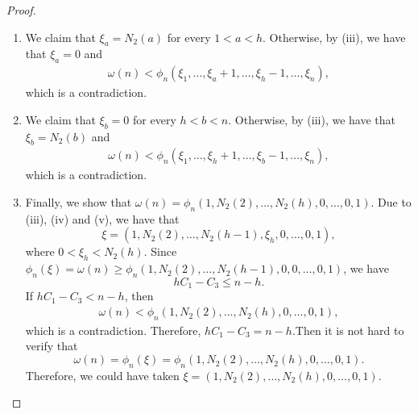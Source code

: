 \documentclass[JMC]{degruyter-journal}
\begin{document}
\begin{proof}
\begin{enumerate}
\item We claim that $\xi_a=N_2(a)$ for every $1<a<h$. Otherwise, by (iii), we have that $\xi_a=0$ and
\begin{eqnarray*}
\omega(n)<\phi_n(\xi_1,\hdots, \xi_{a}+1, \hdots, \xi_h-1, \hdots,
\xi_n),
\end{eqnarray*}
which is a contradiction.



\item We claim  that $\xi_b=0$ for every $h<b<n$. Otherwise, by (iii), we have that $\xi_b=N_2(b)$ and
\begin{eqnarray*}
\omega(n)< \phi_n(\xi_1,\hdots, \xi_h+1, \hdots, \xi_b-1, \hdots, \xi_n),
\end{eqnarray*}
which is a contradiction.

\item
Finally, we show that  $\omega(n)=\phi_n(1,N_2(2),\ldots, N_2(h),
0,\ldots,0,1)$. Due to (iii), (iv) and (v), we have that
$$\xi=(1,N_2(2),\ldots, N_2(h-1),\xi_h, 0,\ldots,0,1),$$
where $0<\xi_h<N_2(h)$.
Since $\phi_n(\xi)=\omega(n)\geq \phi_n(1,N_2(2),\ldots, N_2(h-1),0,
0,\ldots,0,1)$, we have
$$hC_1-C_3\leq n-h.$$  If $hC_1-C_3<  n-h$, then
\begin{eqnarray*}
\omega(n)<\phi_n(1,N_2(2),\ldots, N_2(h), 0,\ldots,0,1),
\end{eqnarray*}
which is a contradiction. Therefore, $hC_1-C_3=  n-h$.Then it is not
hard to verify that
$$\omega(n)=\phi_n(\xi)=
\phi_n(1, N_2(2), \ldots, N_2(h), 0,\ldots,0,1).$$ Therefore,  we
could have taken $\xi=(1, N_2(2), \ldots, N_2(h), 0,\ldots,0,1)$.
\end{enumerate}
\end{proof}
\end{document}
